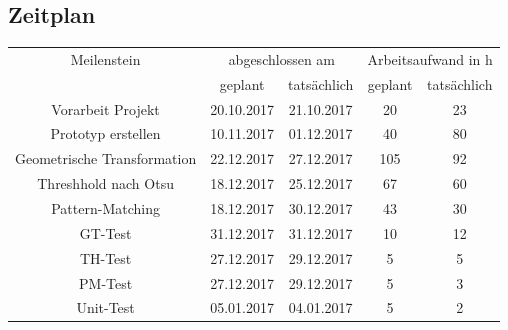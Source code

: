 \documentclass[paper=A4, deutsch]{scrartcl}
\begin{document}
\subsection{Zeitplan}
\begin{table}[h!]
	\centering
		\begin{tabular}{|c|c|c|c|c|}
		\hline
		Meilenstein & \multicolumn{2}{c|}{abgeschlossen am} & \multicolumn{2}{c|}{Arbeitsaufwand in h}\\
		\cline{2-5}
		 & geplant & tatsächlich & geplant & tatsächlich\\
		\hline
		Vorarbeit Projekt& 20.10.2017 & 21.10.2017 & 20 & 23\\
		Prototyp erstellen& 10.11.2017& 01.12.2017 & 40 & 80\\
		Geometrische Transformation& 22.12.2017& 27.12.2017 & 105  & 92 \\
		Threshhold nach Otsu& 18.12.2017& 25.12.2017 & 67 & 60 \\
		Pattern-Matching & 18.12.2017 &30.12.2017 & 43 & 30\\
		GT-Test & 31.12.2017& 31.12.2017 & 10  & 12 \\
		TH-Test & 27.12.2017 & 29.12.2017 & 5 & 5 \\
		PM-Test & 27.12.2017& 29.12.2017 & 5 & 3 \\
		Unit-Test & 05.01.2017& 04.01.2017 & 5 & 2 \\
		\hline
		\end{tabular}
\end{table}


 \newpage
\end{document}

